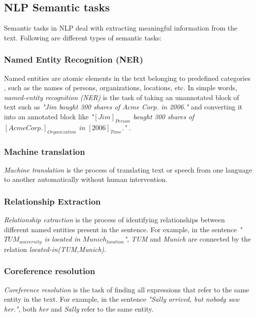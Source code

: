\subsection{NLP Semantic tasks}

Semantic tasks in NLP deal with extracting meaningful information from the text. Following are different types of semantic tasks:

\subsubsection{Named Entity Recognition (NER)}

Named entities are atomic elements in the text belonging to predefined categories \cite{ner1}, such as the names of persons, organizations, locations, etc. In simple words, \textit{named-entity recognition (NER)} is the task of taking an unannotated block of text such as \textit{"Jim bought 300 shares of Acme Corp. in 2006."} and converting it into an annotated block like \textit{"$[Jim]_{Person}$ bought 300 shares of $[Acme Corp.]_{Organization}$ in $[2006]_{Time}$."} \cite{wiki:ner}.

\subsubsection{Machine translation}

\textit{Machine translation} is the process of translating text or speech from one language to another automatically without human intervention.

\subsubsection{Relationship Extraction}\label{sec:RE}

\textit{Relationship extraction} is the process of identifying relationships between different named entities present in the sentence. For example, in the sentence \textit{"$TUM_{university}$ is located in $Munich_{location}$"}, \textit{TUM} and \textit{Munich} are connected by the relation \textit{located-in(TUM,Munich)}.

\subsubsection{Coreference resolution}

\textit{Coreference resolution} is the task of finding all expressions that refer to the same entity in the text. For example, in the sentence \textit{"Sally arrived, but nobody saw her."}, both \textit{her} and \textit{Sally} refer to the same entity.

